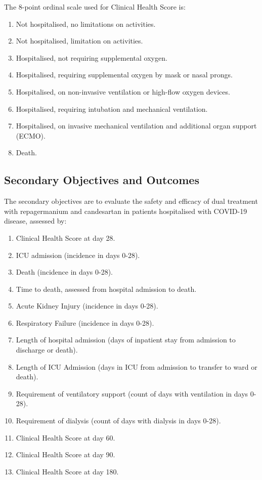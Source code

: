 \documentclass[11pt,parskip=full-]{scrartcl}
\begin{document}
The 8-point ordinal scale used for Clinical Health Score is:
\begin{enumerate}[nolistsep]
    \item Not hospitalised, no limitations on activities.
    \item Not hospitalised, limitation on activities.
    \item Hospitalised, not requiring supplemental oxygen.
    \item Hospitalised, requiring supplemental oxygen by mask or nasal prongs.
    \item  Hospitalised, on non-invasive ventilation or high-flow oxygen devices.
    \item Hospitalised, requiring intubation and mechanical ventilation.
    \item Hospitalised, on invasive mechanical ventilation and additional organ support (ECMO).
    \item Death.
\end{enumerate}

\subsection{Secondary Objectives and Outcomes}
The secondary objectives are to evaluate the safety and efficacy of dual treatment with repagermanium and candesartan in patients hospitalised with COVID-19 disease, assessed by:
\begin{enumerate}
    \item Clinical Health Score at day 28.
    \item ICU admission (incidence in days 0-28).
    \item Death (incidence in days 0-28).
    \item Time to death, assessed from hospital admission to death.
    \item Acute Kidney Injury (incidence in days 0-28).
    \item Respiratory Failure (incidence in days 0-28).
    \item Length of hospital admission (days of inpatient stay from admission to discharge or death).
    \item Length of ICU Admission (days in ICU from admission to transfer to ward or death).
    \item Requirement of ventilatory support (count of days with ventilation in days 0-28).
    \item Requirement of dialysis (count of days with dialysis in days 0-28).
    \item Clinical Health Score at day 60.
    \item Clinical Health Score at day 90.
    \item Clinical Health Score at day 180.
\end{enumerate}
\end{document}
